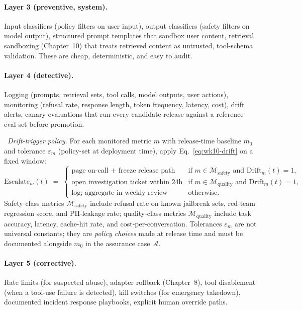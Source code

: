 \paragraph{Layer 3 (preventive, system).} Input classifiers
(policy filters on user input), output classifiers (safety
filters on model output), structured prompt templates that
sandbox user content, retrieval sandboxing (Chapter~10) that treats
retrieved content as untrusted, tool-schema validation. These
are cheap, deterministic, and easy to audit.

\paragraph{Layer 4 (detective).} Logging (prompts, retrieval
sets, tool calls, model outputs, user actions), monitoring
(refusal rate, response length, token frequency, latency,
cost), drift alerts, canary evaluations that run every
candidate release against a reference eval set before promotion.

\Def\ \emph{Drift-trigger policy.} For each monitored metric
$m$ with release-time baseline $m_0$ and tolerance
$\varepsilon_m$ (policy-set at deployment time), apply
Eq.~\eqref{eq:wk10-drift} on a fixed window:
\begin{equation}
  \mathrm{Escalate}_m(t)
  \;=\;
  \begin{cases}
    \text{page on-call + freeze release path}
      & \text{if } m \in \mathcal{M}_\mathrm{safety}
        \text{ and } \mathrm{Drift}_m(t) = 1, \\
    \text{open investigation ticket within 24h}
      & \text{if } m \in \mathcal{M}_\mathrm{quality}
        \text{ and } \mathrm{Drift}_m(t) = 1, \\
    \text{log; aggregate in weekly review}
      & \text{otherwise.}
  \end{cases}
  \label{eq:wk10-escalate}
\end{equation}
Safety-class metrics $\mathcal{M}_\mathrm{safety}$ include refusal
rate on known jailbreak sets, red-team regression score, and
PII-leakage rate; quality-class metrics
$\mathcal{M}_\mathrm{quality}$ include task accuracy, latency,
cache-hit rate, and cost-per-conversation. Tolerances
$\varepsilon_m$ are not universal constants; they are
\emph{policy choices} made at release time and must be
documented alongside $m_0$ in the assurance case $\mathcal{A}$.

\paragraph{Layer 5 (corrective).} Rate limits (for suspected
abuse), adapter rollback (Chapter~8), tool disablement (when a
tool-use failure is detected), kill switches (for emergency
takedown), documented incident response playbooks, explicit
human override paths.

